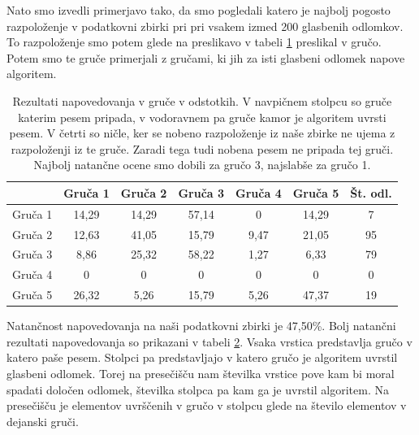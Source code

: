 \documentclass[a4paper, 12pt]{book}
\begin{document}
{\begin{table}[htb]
\begin{center}
\begin{tabular}{|l|c|}
\hline
\end{tabular}
\label{gruce_nase}
\end{center}
\end{table}

Nato smo izvedli primerjavo tako, da smo pogledali katero je najbolj pogosto razpoloženje v podatkovni zbirki pri pri vsakem izmed 200 glasbenih odlomkov. To razpoloženje smo potem glede na preslikavo v tabeli \ref{gruce_nase} preslikal v gručo. Potem smo te gruče primerjali z gručami, ki jih za isti glasbeni odlomek napove algoritem. 

\begin{table}[htb]
\begin{center}
\caption{Rezultati napovedovanja v gruče v odstotkih. V navpičnem stolpcu so gruče katerim pesem pripada, v vodoravnem pa gruče kamor je algoritem uvrsti pesem. V četrti so ničle, ker se nobeno razpoloženje iz naše zbirke ne ujema z razpoloženji iz te gruče. Zaradi tega tudi nobena pesem ne pripada tej gruči. Najbolj natančne ocene smo dobili za gručo 3, najslabše za gručo 1.}
\begin{tabular}{|l|c|c|c|c|c|c|}
\hline
 & Gruča 1 & Gruča 2 & Gruča 3 & Gruča 4 & Gruča 5 & Št. odl.\\ \hline
Gruča 1 & 14,29 & 14,29	& 57,14 & 0 & 14,29 & 7\\ \hline
Gruča 2 & 12,63 & 41,05 & 15,79 & 9,47 & 21,05 & 95\\ \hline
Gruča 3 & 8,86 & 25,32 & 58,22 & 1,27 & 6,33 & 79\\ \hline
Gruča 4 & 0	& 0 & 0 & 0 & 0 & 0\\ \hline
Gruča 5 & 26,32	& 5,26	& 15,79 & 5,26 & 47,37 & 19 \\ \hline

\hline
\end{tabular}
\label{natancnost_gruce_nasa}
\end{center}
\end{table}

Natančnost napovedovanja na naši podatkovni zbirki je 47,50\%. Bolj natančni rezultati napovedovanja so prikazani v tabeli \ref{natancnost_gruce_nasa}. Vsaka vrstica predstavlja gručo v katero paše pesem. Stolpci pa predstavljajo v katero gručo je algoritem uvrstil glasbeni odlomek. Torej na presečišču nam številka vrstice pove kam bi moral spadati določen odlomek, številka stolpca pa kam ga je uvrstil algoritem. Na presečišču je elementov uvrščenih v gručo v stolpcu glede na število elementov v dejanski gruči. 

}
\end{document}
